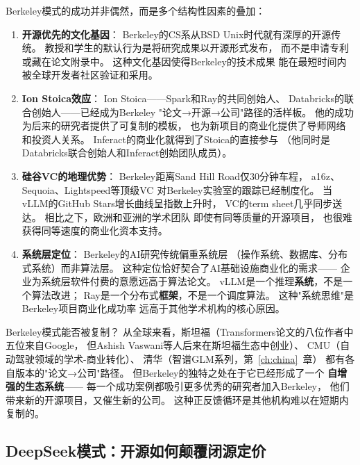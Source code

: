 \begin{whybox}[为什么Berkeley实验室能批量制造独角兽]
Berkeley模式的成功并非偶然，而是多个结构性因素的叠加：

\begin{enumerate}
  \item \textbf{开源优先的文化基因}：
    Berkeley的CS系从BSD Unix时代就有深厚的开源传统。
    教授和学生的默认行为是将研究成果以开源形式发布，
    而不是申请专利或藏在论文附录中。
    这种文化基因使得Berkeley的技术成果
    能在最短时间内被全球开发者社区验证和采用。

  \item \textbf{Ion Stoica效应}：
    Ion Stoica——Spark和Ray的共同创始人、
    Databricks的联合创始人——已经成为Berkeley
    "论文→开源→公司"路径的活样板。
    他的成功为后来的研究者提供了可复制的模板，
    也为新项目的商业化提供了导师网络和投资人关系。
    Inferact的商业化就得到了Stoica的直接参与
    （他同时是Databricks联合创始人和Inferact创始团队成员）。

  \item \textbf{硅谷VC的地理优势}：
    Berkeley距离Sand Hill Road仅30分钟车程，
    a16z、Sequoia、Lightspeed等顶级VC
    对Berkeley实验室的跟踪已经制度化。
    当vLLM的GitHub Stars增长曲线呈指数上升时，
    VC的term sheet几乎同步送达。
    相比之下，欧洲和亚洲的学术团队
    即使有同等质量的开源项目，
    也很难获得同等速度的商业化资本支持。

  \item \textbf{系统层定位}：
    Berkeley的AI研究传统偏重系统层
    （操作系统、数据库、分布式系统）而非算法层。
    这种定位恰好契合了AI基础设施商业化的需求——
    企业为系统层软件付费的意愿远高于算法论文。
    vLLM是一个推理\textbf{系统}，不是一个算法改进；
    Ray是一个分布式\textbf{框架}，不是一个调度算法。
    这种"系统思维"是Berkeley项目商业化成功率
    远高于其他学术机构的核心原因。
\end{enumerate}
\end{whybox}

Berkeley模式能否被复制？
从全球来看，斯坦福（Transformers论文的八位作者中五位来自Google，
但Ashish Vaswani等人后来在斯坦福生态中创业）、
CMU（自动驾驶领域的学术-商业转化）、
清华（智谱GLM系列，第~\ref{ch:china}~章）
都有各自版本的"论文→公司"路径。
但Berkeley的独特之处在于它已经形成了一个
\textbf{自增强的生态系统}——
每一个成功案例都吸引更多优秀的研究者加入Berkeley，
他们带来新的开源项目，又催生新的公司。
这种正反馈循环是其他机构难以在短期内复制的。


\subsection{DeepSeek模式：开源如何颠覆闭源定价}


